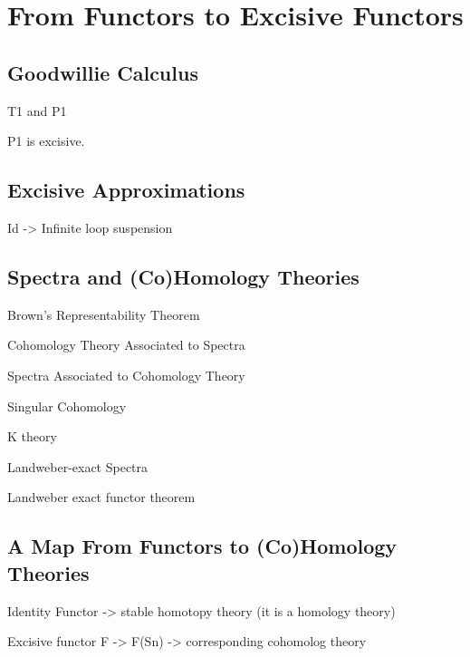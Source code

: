 \documentclass[a4paper]{article}
\begin{document}
\pagebreak
\section{From Functors to Excisive Functors}
\subsection{Goodwillie Calculus}
\begin{defn}{}{} T1 and P1
\end{defn}

\begin{thm}{}{} P1 is excisive. 
\end{thm}

\subsection{Excisive Approximations}
\begin{eg}{}{} Id -> Infinite loop suspension
\end{eg}

\subsection{Spectra and (Co)Homology Theories}
\begin{thm}{Brown's Representability Theorem}{}
\end{thm}

\begin{defn}{Cohomology Theory Associated to Spectra}{}
\end{defn}

\begin{defn}{Spectra Associated to Cohomology Theory}{}
\end{defn}

\begin{eg}{Singular Cohomology}{}
\end{eg}

\begin{eg}{K theory}{}
\end{eg}

\begin{eg}{Landweber-exact Spectra}{}
\end{eg}

\begin{thm}{Landweber exact functor theorem}{}
\end{thm}

\subsection{A Map From Functors to (Co)Homology Theories}
\begin{eg}{}{} Identity Functor -> stable homotopy theory (it is a homology theory)
\end{eg}

\begin{eg}{}{} Excisive functor F -> {F(Sn)} -> corresponding cohomolog theory
\end{eg}
\end{document}
